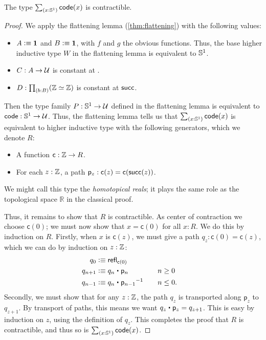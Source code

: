 \begin{lem}
  The type $\sm{x:\Sn^1}\code(x)$ is contractible.
\end{lem}
\begin{proof}
  We apply the flattening lemma (\autoref{thm:flattening}) with the following values:
  \begin{itemize}
  \item $A\vcentcolon\equiv\mathbf{1}$ and $B\vcentcolon\equiv\mathbf{1}$, with $f$ and $g$ the obvious functions.
    Thus, the base higher inductive type $W$ in the flattening lemma is equivalent to $\mathbb{S}^1$.
  \item $C:A\to\mathcal{U}$ is constant at \Z.
  \item $D:\prd{b:B} (\eqv{\Z}{\Z})$ is constant at $\mathsf{succ}$.
  \end{itemize}
  Then the type family $P:\mathbb{S}^1\to\mathcal{U}$ defined in the flattening lemma is equivalent to $\mathsf{code}:\mathbb{S}^1\to\mathcal{U}$.
  Thus, the flattening lemma tells us that $\sm{x:\Sn^1}\code(x)$ is equivalent to higher inductive type with the following generators, which we denote $R$:
  \begin{itemize}
  \item A function $\mathsf{c}: \mathbb{Z} \to R$.
  \item For each $z:\mathbb{Z}$, a path $\mathsf{p}_z:\mathsf{c}(z) = \mathsf{c}(\mathsf{succ}(z))$.
  \end{itemize}
  We might call this type the \emph{homotopical reals}; it plays the same role as the topological space $\mathbb{R}$ in the classical proof.

  Thus, it remains to show that $R$ is contractible.
  As center of contraction we choose $\mathsf{c}(0)$; we must now show that $x=\mathsf{c}(0)$ for all $x:R$.
  We do this by induction on $R$.
  Firstly, when $x$ is $\mathsf{c}(z)$, we must give a path $q_z:\mathsf{c}(0) = \mathsf{c}(z)$, which we can do by induction on $z:\mathbb{Z}$:
  \begin{alignat*}{2}
    q_0 &\defeq \refl{\mathsf{c}(0)}\\
    q_{n+1} &\defeq q_n \ct \mathsf{p}_n && \quad n\ge 0\\
    q_{n-1} &\defeq q_n \ct \opp{\mathsf{p}_{n-1}} && \quad n\le 0.
  \end{alignat*}
  Secondly, we must show that for any $z:\mathbb{Z}$, the path $q_z$ is transported along $\mathsf{p}_z$ to $q_{z+1}$.
  By transport of paths, this means we want $q_z \ct \mathsf{p}_z = q_{z+1}$.
  This is easy by induction on $z$, using the definition of $q_z$.
  This completes the proof that $R$ is contractible, and thus so is $\sm{x:\Sn^1}\code(x)$.
\end{proof}

